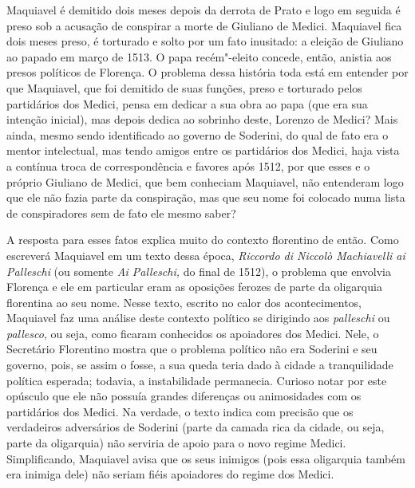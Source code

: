 Maquiavel é demitido dois meses depois da derrota de Prato e logo em
seguida é preso sob a acusação de conspirar a morte de Giuliano de
Medici. Maquiavel fica dois meses preso, é torturado e solto por um fato
inusitado: a eleição de Giuliano ao papado em março de 1513. O papa
recém"-eleito concede, então, anistia aos presos políticos de Florença. O
problema dessa história toda está em entender por que Maquiavel, que foi
demitido de suas funções, preso e torturado pelos partidários dos
Medici, pensa em dedicar a sua obra ao papa (que era sua intenção
inicial), mas depois dedica ao sobrinho deste, Lorenzo de Medici? Mais
ainda, mesmo sendo identificado ao governo de Soderini, do qual de fato
era o mentor intelectual, mas tendo amigos entre os partidários dos
Medici, haja vista a contínua troca de correspondência e favores após
1512, por que esses e o próprio Giuliano de Medici, que bem conheciam
Maquiavel, não entenderam logo que ele não fazia parte da conspiração,
mas que seu nome foi colocado numa lista de conspiradores sem de fato
ele mesmo saber?

A resposta para esses fatos explica muito do contexto florentino de
então. Como escreverá Maquiavel em um texto dessa época, \emph{Riccordo
di Niccolò Machiavelli ai Palleschi} (ou somente \emph{Ai Palleschi,} do
final de 1512), o problema que envolvia Florença e ele em particular
eram as oposições ferozes de parte da oligarquia florentina ao seu nome.
Nesse texto, escrito no calor dos acontecimentos, Maquiavel faz uma
análise deste contexto político se dirigindo aos \emph{palleschi} ou
\emph{pallesco}, ou seja, como ficaram conhecidos os apoiadores dos
Medici. Nele, o Secretário Florentino mostra que o problema político não
era Soderini e seu governo, pois, se assim o fosse, a sua queda teria
dado à cidade a tranquilidade política esperada; todavia, a
instabilidade permanecia. Curioso notar por este opúsculo que ele não
possuía grandes diferenças ou animosidades com os partidários dos
Medici. Na verdade, o texto indica com precisão que os verdadeiros
adversários de Soderini (parte da camada rica da cidade, ou seja, parte
da oligarquia) não serviria de apoio para o novo regime Medici.
Simplificando, Maquiavel avisa que os seus inimigos (pois essa
oligarquia também era inimiga dele) não seriam fiéis apoiadores do
regime dos Medici.

